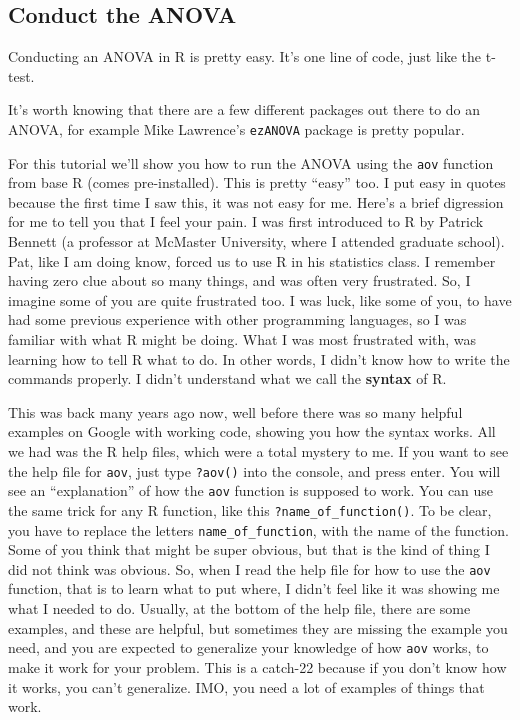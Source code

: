\documentclass[
]{book}
\begin{document}
\hypertarget{conduct-the-anova}{%
\subsection{Conduct the ANOVA}\label{conduct-the-anova}}

Conducting an ANOVA in R is pretty easy. It's one line of code, just like the t-test.

It's worth knowing that there are a few different packages out there to do an ANOVA, for example Mike Lawrence's \texttt{ezANOVA} package is pretty popular.

For this tutorial we'll show you how to run the ANOVA using the \texttt{aov} function from base R (comes pre-installed). This is pretty ``easy'' too. I put easy in quotes because the first time I saw this, it was not easy for me. Here's a brief digression for me to tell you that I feel your pain. I was first introduced to R by Patrick Bennett (a professor at McMaster University, where I attended graduate school). Pat, like I am doing know, forced us to use R in his statistics class. I remember having zero clue about so many things, and was often very frustrated. So, I imagine some of you are quite frustrated too. I was luck, like some of you, to have had some previous experience with other programming languages, so I was familiar with what R might be doing. What I was most frustrated with, was learning how to tell R what to do. In other words, I didn't know how to write the commands properly. I didn't understand what we call the \textbf{syntax} of R.

This was back many years ago now, well before there was so many helpful examples on Google with working code, showing you how the syntax works. All we had was the R help files, which were a total mystery to me. If you want to see the help file for \texttt{aov}, just type \texttt{?aov()} into the console, and press enter. You will see an ``explanation'' of how the \texttt{aov} function is supposed to work. You can use the same trick for any R function, like this \texttt{?name\_of\_function()}. To be clear, you have to replace the letters \texttt{name\_of\_function}, with the name of the function. Some of you think that might be super obvious, but that is the kind of thing I did not think was obvious. So, when I read the help file for how to use the \texttt{aov} function, that is to learn what to put where, I didn't feel like it was showing me what I needed to do. Usually, at the bottom of the help file, there are some examples, and these are helpful, but sometimes they are missing the example you need, and you are expected to generalize your knowledge of how \texttt{aov} works, to make it work for your problem. This is a catch-22 because if you don't know how it works, you can't generalize. IMO, you need a lot of examples of things that work.
\end{document}
